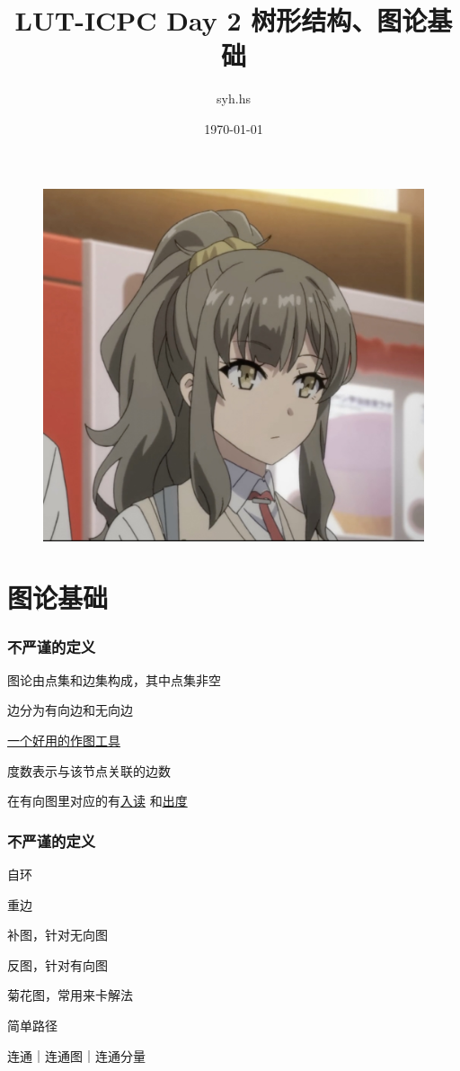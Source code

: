 \documentclass{beamer}
\author{syh.hs}
\title{LUT-ICPC Day 2 树形结构、图论基础}
\date{\today}
\institute{兰州理工大学}
\begin{document}

  

  \begin{frame}[plain]
    \maketitle
    \begin{figure}[htbp] %
    \centering %
    \includegraphics[width=0.3\textheight,height=0.2\textwidth]{new- 2.jpg} %
    \end{figure}
  \end{frame}

  \section{图论基础}

  \begin{frame}
    \frametitle{不严谨的定义}
    图论由点集和边集构成，其中点集非空

    \vspace*{1\baselineskip}
    
    边分为有向边和无向边

    \vspace*{1\baselineskip}
    
    \href{https://csacademy.com/app/graph_editor/}{一个好用的作图工具}
    
    \vspace*{1\baselineskip}

    度数表示与该节点关联的边数
    
    在有向图里对应的有\underline{入读}
    和\underline{出度}

    
  \end{frame}

  \begin{frame}
    \frametitle{不严谨的定义}
    自环
    
    重边

    补图，针对无向图

    反图，针对有向图

    菊花图，常用来卡解法

    简单路径

    连通｜连通图｜连通分量
  \end{frame}
\end{document}
